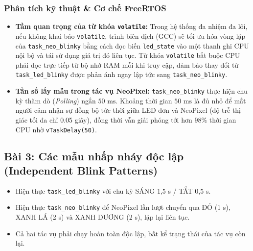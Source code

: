 \subsubsection{Phân tích kỹ thuật \& Cơ chế FreeRTOS}
\begin{itemize}
    \item \textbf{Tầm quan trọng của từ khóa \texttt{volatile}:} Trong hệ thống đa nhiệm đa lõi, nếu không khai báo \texttt{volatile}, trình biên dịch (GCC) sẽ tối ưu hóa vòng lặp của \texttt{task\_neo\_blinky} bằng cách đọc biến \texttt{led\_state} vào một thanh ghi CPU nội bộ và tái sử dụng giá trị đó liên tục. Từ khóa \texttt{volatile} bắt buộc CPU phải đọc trực tiếp từ bộ nhớ RAM mỗi khi truy cập, đảm bảo thay đổi từ \texttt{task\_led\_blinky} được phản ánh ngay lập tức sang \texttt{task\_neo\_blinky}.
    \item \textbf{Tần số lấy mẫu trong tác vụ NeoPixel:} \texttt{task\_neo\_blinky} thực hiện chu kỳ thăm dò (\textit{Polling}) ngắn $50\text{ ms}$. Khoảng thời gian $50\text{ ms}$ là đủ nhỏ để mắt người cảm nhận sự đồng bộ tức thời giữa LED đơn và NeoPixel (độ trễ thị giác tối đa chỉ 0.05 giây), đồng thời vẫn giải phóng tới hơn $98\%$ thời gian CPU nhờ \texttt{vTaskDelay(50)}.
\end{itemize}

\newpage
\subsection{Bài 3: Các mẫu nhấp nháy độc lập (Independent Blink Patterns)}

\begin{tcolorbox}[
    enhanced, colback=black!2, colframe=black!60, boxrule=1pt, arc=2.5mm, drop shadow,
    attach boxed title to top left={xshift=4mm, yshift=-3mm},
    boxed title style={enhanced, colback=black!85, colframe=black!85, boxrule=1pt, arc=2.5mm, drop shadow, left=6pt, right=6pt, top=2pt, bottom=2pt},
    title=\textcolor{white}{\large\textbf{Yêu cầu đề bài (Trích phiếu bài tập)}}
]
\bfseries
\vspace{0.2cm}
\begin{itemize}
    \item Hiện thực \texttt{task\_led\_blinky} với chu kỳ SÁNG 1,5 s / TẮT 0,5 s.
    \item Hiện thực \texttt{task\_neo\_blinky} để NeoPixel lần lượt chuyển qua ĐỎ (1 s), XANH LÁ (2 s) và XANH DƯƠNG (2 s), lặp lại liên tục.
    \item Cả hai tác vụ phải chạy hoàn toàn độc lập, bất kể trạng thái của tác vụ còn lại.
\end{itemize}
\end{tcolorbox}

